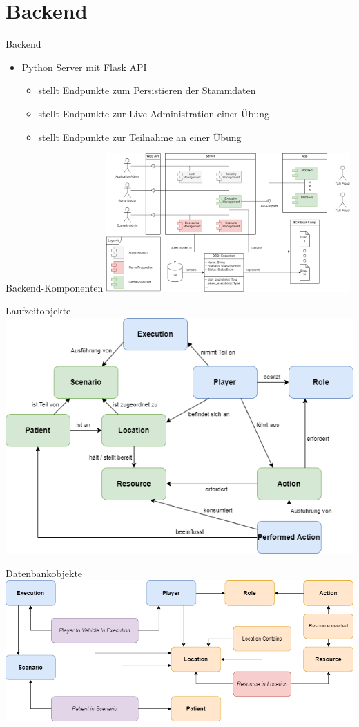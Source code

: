 \section{Backend}


\begin{frame}{Backend}
	\begin{itemize}
		\item Python Server mit Flask API
		\begin{itemize}
			\item stellt Endpunkte zum Persistieren der Stammdaten
			\item stellt Endpunkte zur Live Administration einer Übung
			\item stellt Endpunkte zur Teilnahme an einer Übung
		\end{itemize}
	\end{itemize}
\end{frame}


\begin{frame}{Backend-Komponenten}
	\centering
	\includegraphics[width=0.7\textwidth]{images/server/component_diagram.png}
\end{frame}


\begin{frame}{Laufzeitobjekte}
	\centering
	\includegraphics[height=.86\textheight]{images/server_laufzeit_objekte.png}
\end{frame}


\begin{frame}{Datenbankobjekte}
	\centering
	\includegraphics[width=\textwidth]{images/server_datenbank_objekte.png}
\end{frame}
